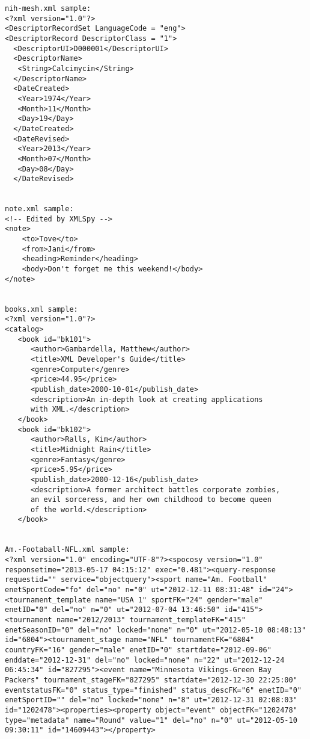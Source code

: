 \documentclass[11pt,english]{article}
\begin{document}
\begin{enumerate}
\begin{lstlisting}
nih-mesh.xml sample:
<?xml version="1.0"?>
<DescriptorRecordSet LanguageCode = "eng">
<DescriptorRecord DescriptorClass = "1">
  <DescriptorUI>D000001</DescriptorUI>
  <DescriptorName>
   <String>Calcimycin</String>
  </DescriptorName>
  <DateCreated>
   <Year>1974</Year>
   <Month>11</Month>
   <Day>19</Day>
  </DateCreated>
  <DateRevised>
   <Year>2013</Year>
   <Month>07</Month>
   <Day>08</Day>
  </DateRevised>


note.xml sample:
<!-- Edited by XMLSpy -->
<note>
    <to>Tove</to>
    <from>Jani</from>
    <heading>Reminder</heading>
    <body>Don't forget me this weekend!</body>
</note>


books.xml sample:
<?xml version="1.0"?>
<catalog>
   <book id="bk101">
      <author>Gambardella, Matthew</author>
      <title>XML Developer's Guide</title>
      <genre>Computer</genre>
      <price>44.95</price>
      <publish_date>2000-10-01</publish_date>
      <description>An in-depth look at creating applications 
      with XML.</description>
   </book>
   <book id="bk102">
      <author>Ralls, Kim</author>
      <title>Midnight Rain</title>
      <genre>Fantasy</genre>
      <price>5.95</price>
      <publish_date>2000-12-16</publish_date>
      <description>A former architect battles corporate zombies, 
      an evil sorceress, and her own childhood to become queen 
      of the world.</description>
   </book>


Am.-Footaball-NFL.xml sample:
<?xml version="1.0" encoding="UTF-8"?><spocosy version="1.0" responsetime="2013-05-17 04:15:12" exec="0.481"><query-response requestid="" service="objectquery"><sport name="Am. Football" enetSportCode="fo" del="no" n="0" ut="2012-12-11 08:31:48" id="24"><tournament_template name="USA 1" sportFK="24" gender="male" enetID="0" del="no" n="0" ut="2012-07-04 13:46:50" id="415"><tournament name="2012/2013" tournament_templateFK="415" enetSeasonID="0" del="no" locked="none" n="0" ut="2012-05-10 08:48:13" id="6804"><tournament_stage name="NFL" tournamentFK="6804" countryFK="16" gender="male" enetID="0" startdate="2012-09-06" enddate="2012-12-31" del="no" locked="none" n="22" ut="2012-12-24 06:45:34" id="827295"><event name="Minnesota Vikings-Green Bay Packers" tournament_stageFK="827295" startdate="2012-12-30 22:25:00" eventstatusFK="0" status_type="finished" status_descFK="6" enetID="0" enetSportID="" del="no" locked="none" n="8" ut="2012-12-31 02:08:03" id="1202478"><properties><property object="event" objectFK="1202478" type="metadata" name="Round" value="1" del="no" n="0" ut="2012-05-10 09:30:11" id="14609443"></property>
\end{lstlisting}


\end{enumerate}
\end{document}
